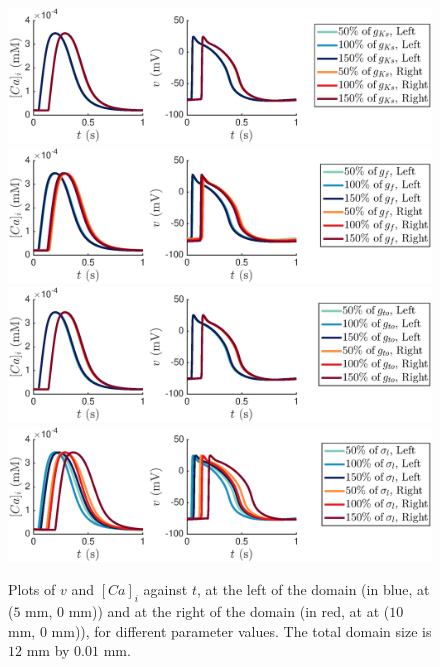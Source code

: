 \documentclass[12pt,a4paper]{article}
\begin{document}
\begin{figure}
   \includegraphics[trim=3cm 0cm 4cm 0cm, clip=true, width=1\linewidth]{strip_gks} 
   \includegraphics[trim=3cm 0cm 4cm 0cm, clip=true, width=1\linewidth]{strip_gf} 
      \includegraphics[trim=3cm 0cm 4cm 0cm, clip=true, width=1\linewidth]{strip_gto} 
         \includegraphics[trim=3cm 0cm 4cm 0cm, clip=true, width=1\linewidth]{strip_sigmal} 
    \caption{Plots of $v$ and $[Ca]_i$ against $t$, at the left of the domain (in blue, at ($5$ mm, $0$ mm)) and at the right of the domain (in red, at at ($10$ mm, $0$ mm)), for different parameter values. The total domain size is $12$ mm by $0.01$ mm.}
    \label{fig:5}
\end{figure}
%
%
\end{document}
